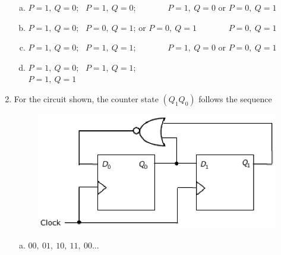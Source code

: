 \documentclass[journal,12pt,twocolumn]{IEEEtran}
\begin{document}
\begin{enumerate}
\begin{figure}
\caption{}

\label{fig:30}

\end{figure} 

 

\begin{enumerate}[(a)]
 
\item $ P=1,\ Q=0$; \  $ P=1,\ Q=0$; \ \ \ \ \ \ \ $ P=1,\ Q=0$ or $ P=0,\ Q=1$

\item $ P=1,\ Q=0$; \  $ P=0,\ Q=1$; or $ P=0,\ Q=1$ \ \ \ \ \ \ \  $ P=0,\ Q=1$ 

\item $ P=1,\ Q=0$; \  $ P=1,\ Q=1$; \ \ \ \ \ \ \ $ P=1,\ Q=0$ or $ P=0,\ Q=1$

\item $ P=1,\ Q=0$; \  $ P=1,\ Q=1$; \ \ \ \ \ \ \ \ \ \ \ \ \ \ \ \ \ \ \ \ \ \ \ \ \ \ \ \ \ \ $ P=1,\ Q=1$ 


\end{enumerate}
 

\item For the circuit shown, the counter state $(Q_1Q_0)$ follows the sequence

\begin{figure}

\centering

\includegraphics[width=\columnwidth]{./figs/36.eps}

\caption{}

\label{fig:31}

\end{figure} 




\begin{enumerate}[(a)]
 
\item $ 00,\ 01,\ 10,\ 11,\ 00 ... $


\end{enumerate}
\end{enumerate}
\end{document}
